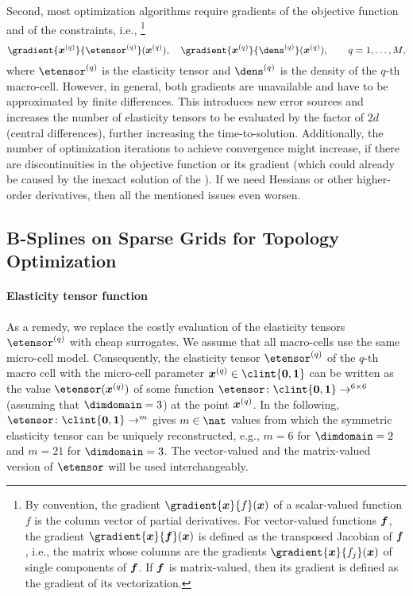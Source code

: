 Second, most optimization algorithms require gradients of the
objective function and of the constraints, i.e.,%
\footnote{%
  By convention, the gradient $\gradient{\*x}{f}(\*x)$ of a
  scalar-valued function $f$ is the column vector of partial derivatives.
  For vector-valued functions ${\boldsymbol{f}}$, the gradient $\gradient{\*x}{\*f}(\*x)$
  is defined as the transposed Jacobian of ${\boldsymbol{f}}$, i.e.,
  the matrix whose columns are the gradients $\gradient{\*x}{f_j}(\*x)$ of
  single components of ${\boldsymbol{f}}$.
  If ${\boldsymbol{f}}$ is matrix-valued, then its gradient is defined as the
  gradient of its vectorization.%
}
\begin{equation}
  \gradient{\*x^{(q)}}{\etensor^{(q)}}(\*x^{(q)}),\quad
  \gradient{\*x^{(q)}}{\dens^{(q)}}(\*x^{(q)}),\qquad
  q = 1, \dotsc, M,
\end{equation}
where $\etensor^{(q)}$ is the elasticity tensor and
$\dens^{(q)}$ is the density of the $q$-th macro-cell.
However, in general, both gradients are unavailable and
have to be approximated by finite differences.
This introduces new error sources and
increases the number of elasticity tensors to be evaluated
by the factor of $2d$ (central differences),
further increasing the time-to-solution.
Additionally, the number of optimization iterations to
achieve convergence might increase,
if there are discontinuities in the objective function
or its gradient
(which could already be caused by the inexact solution of the \fem).
If we need Hessians or other higher-order derivatives,
then all the mentioned issues even worsen.



\subsection{B-Splines on Sparse Grids for Topology Optimization}
\label{sec:622BSplines}

\paragraph{Elasticity tensor function}

As a remedy, we replace the costly evaluation of the
elasticity tensors $\etensor^{(q)}$ with cheap surrogates.
We assume that all macro-cells use the same micro-cell model.
Consequently, the elasticity tensor $\etensor^{(q)}$ of the $q$-th macro cell
with the micro-cell parameter $\*x^{(q)} \in \clint{\*0, \*1}$
can be written as the value $\etensor(\*x^{(q)})$ of some function
$\etensor\colon \clint{\*0, \*1} \to \real^{6 \times 6}$
(assuming that $\dimdomain = 3$) at the point ${\boldsymbol{x}}^{(q)}$.
In the following,
$\etensor\colon \clint{\*0, \*1} \to \real^m$
gives $m \in \nat$ values from which the symmetric elasticity tensor
can be uniquely reconstructed,
e.g., $m = 6$ for $\dimdomain = 2$ and $m = 21$ for $\dimdomain = 3$.
The vector-valued and the matrix-valued version of $\etensor$
will be used interchangeably.

